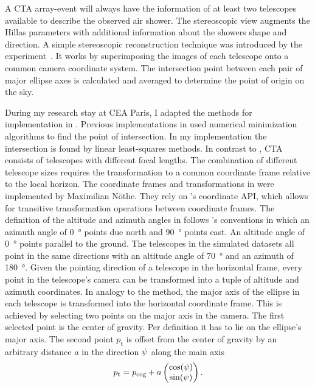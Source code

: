 A CTA array-event will always have the information of at least two telescopes available to describe the observed air shower.
The stereoscopic view augments the Hillas parameters with additional information about the showers shape and direction.
A simple stereoscopic reconstruction technique was introduced by the \hegra experiment~\cite{hegra}. It works by superimposing the 
images of each telescope onto a common camera coordinate system. The intersection point between each pair of major ellipse axes
is calculated and averaged to determine the point of origin on the sky.

During my research stay at CEA Paris, I adapted the \hegra methods for implementation in \ctapipe. 
Previous implementations in \ctapipe used numerical minimization algorithms to find the point of intersection. In my implementation the 
intersection is found by linear least-squares methods.
In contrast to \hegra, CTA consists of telescopes with different focal lengths. The combination of different telescope sizes requires the transformation to 
a common coordinate frame relative to the local horizon.
The coordinate frames and transformations in \ctapipe were implemented by Maximilian Nöthe. They rely on \astropy's coordinate API, which allows for 
transitive transformation operations between coordinate frames.
The definition of the altitude and azimuth angles in \ctapipe follows \astropy's conventions in which an azimuth angle of \SI{0}{\degree} points due north and  
\SI{90}{\degree} points east. An altitude angle of \SI{0}{\degree} points parallel to the ground. 
The telescopes in the simulated datasets all point in the same directions with an altitude angle of \SI{70}{\degree} and 
an azimuth of \SI{180}{\degree}.
Given the pointing direction of a telescope in the horizontal frame, every point in the telescope's camera
can be transformed into a tuple of altitude and azimuth coordinates. 
In analogy to the \hegra method, the major axis of the ellipse in each telescope is transformed into the horizontal coordinate frame. 
This is achieved by selecting two points on the major axis in the camera.
The first selected point is the center of gravity. Per definition it has to lie on the ellipse's major axis.
The second point $p_{\text{t}}$ is offset from the center of gravity by an arbitrary distance $a$ in the direction $\psi$ along the main axis  
\begin{equation*}
    p_{\text{t}} = p_{\text{cog}} + a \begin{pmatrix}
        \cos(\psi) \\
        \sin(\psi) 
    \end{pmatrix}.
\end{equation*}
